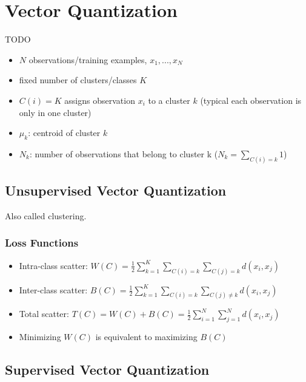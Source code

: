 \chapter{Vector Quantization}\label{chapter:vq}
TODO

\begin{itemize}
\item $N$ observations/training examples, $x_1, ..., x_N$
\item fixed number of clusters/classes $K$
\item $C(i) = K$ assigns observation $x_i$ to a cluster $k$ (typical each observation is only in one cluster)
\item $\mu_k$: centroid of cluster $k$
\item $N_k$: number of observations that belong to cluster k ($N_k = \sum\limits_{C(i)=k} 1$)
\end{itemize}

\section{Unsupervised Vector Quantization}
Also called clustering.

\subsection{Loss Functions}
\begin{itemize}
\item Intra-class scatter: $W(C) = \frac{1}{2} \sum\limits_{k=1}^K \sum\limits_{C(i)=k} \sum\limits_{C(j)=k} d(x_i, x_j)$
\item Inter-class scatter: $B(C) = \frac{1}{2} \sum\limits_{k=1}^K \sum\limits_{C(i)=k} \sum\limits_{C(j)\neq k} d(x_i, x_j)$
\item Total scatter: $T(C) = W(C) + B(C) = \frac{1}{2} \sum\limits_{i=1}^N \sum_{j=1}^N d(x_i, x_j)$
\item Minimizing $W(C)$ is equivalent to maximizing $B(C)$
\end{itemize}



\section{Supervised Vector Quantization}



